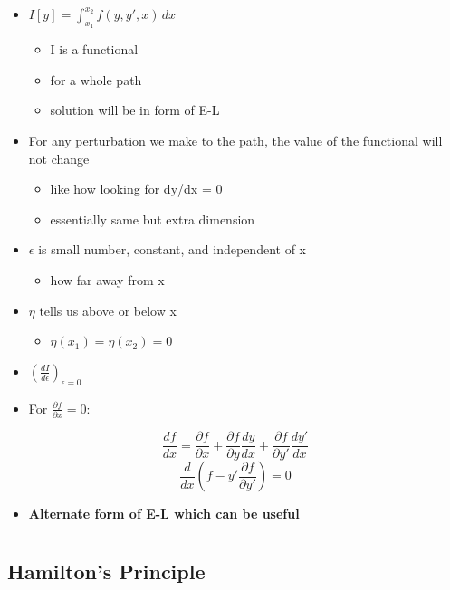 \documentclass[a4paper,11pt,normalem]{article}
\begin{document}
\begin{itemize}
\item
  \(I[y] = \int_{x_1}^{x_2} f(y,y',x)\,dx\)
  \begin{itemize}
  \item
    I is a functional
  \item
    for a whole path
  \item
    solution will be in form of E-L
  \end{itemize}
\item
  For any perturbation we make to the path, the value of the functional
  will not change
  \begin{itemize}
  \item
    like how looking for dy/dx = 0
  \item
    essentially same but extra dimension
  \end{itemize}
\item
  \(\epsilon\) is small number, constant, and independent of x
  \begin{itemize}
  \item
    how far away from x
  \end{itemize}
\item
  \(\eta\) tells us above or below x
  \begin{itemize}
  \item
    \(\eta(x_1) = \eta(x_2) = 0\)
  \end{itemize}
\item
  \((\frac{dI}{d\epsilon})_{\epsilon = 0_{}}\)
\item
  For \(\frac{\partial f}{\partial x} = 0\):
\end{itemize}
\[
    \frac{df}{dx} = \frac{\partial f}{\partial x} + \frac{\partial f}{\partial y}\frac{dy}{dx} + \frac{\partial f}{\partial y'}\frac{dy'}{dx} \]
\[
    \frac{d}{dx}(f - y'\frac{\partial f}{\partial y'}) = 0
\]

\begin{itemize}
\item
  \textbf{Alternate form of E-L which can be useful}
\end{itemize}

\section{}\label{lecture-4}
\subsection{Hamilton's Principle}\label{hamiltons-principle}
\end{document}
